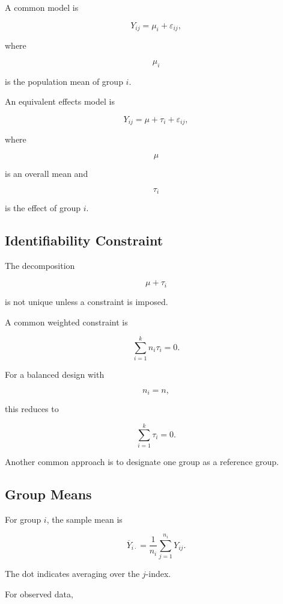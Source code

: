 A common model is

\[
\boxed{
Y_{ij}
=
\mu_i
+
\varepsilon_{ij},
}
\]

where

\[
\mu_i
\]

is the population mean of group \(i\).

An equivalent effects model is

\[
\boxed{
Y_{ij}
=
\mu
+
\tau_i
+
\varepsilon_{ij},
}
\]

where

\[
\mu
\]

is an overall mean and

\[
\tau_i
\]

is the effect of group \(i\).

\subsection{Identifiability Constraint}
\label{subsec:anova-identifiability}

The decomposition

\[
\mu+\tau_i
\]

is not unique unless a constraint is imposed.

A common weighted constraint is

\[
\boxed{
\sum_{i=1}^{k}
n_i\tau_i
=
0.
}
\]

For a balanced design with

\[
n_i=n,
\]

this reduces to

\[
\boxed{
\sum_{i=1}^{k}
\tau_i
=
0.
}
\]

Another common approach is to designate one group as a reference group.

\subsection{Group Means}
\label{subsec:anova-group-means}

For group \(i\), the sample mean is

\[
\boxed{
\overline{Y}_{i\cdot}
=
\frac1{n_i}
\sum_{j=1}^{n_i}
Y_{ij}.
}
\]

The dot indicates averaging over the \(j\)-index.

For observed data,

